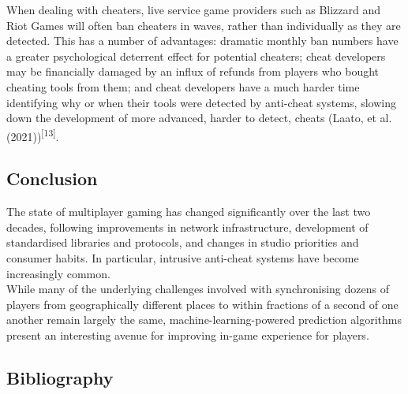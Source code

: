 \documentclass[
]{article}
\begin{document}
When dealing with cheaters, live service game providers such as Blizzard
and Riot Games will often ban cheaters in waves, rather than
individually as they are detected. This has a number of advantages:
dramatic monthly ban numbers have a greater psychological deterrent
effect for potential cheaters; cheat developers may be financially
damaged by an influx of refunds from players who bought cheating tools
from them; and cheat developers have a much harder time identifying why
or when their tools were detected by anti-cheat systems, slowing down
the development of more advanced, harder to detect, cheats (Laato, et
al. (2021))\textsuperscript{{[}13{]}}.

\hypertarget{conclusion}{%
\subsection{Conclusion}\label{conclusion}}

The state of multiplayer gaming has changed significantly over the last
two decades, following improvements in network infrastructure,
development of standardised libraries and protocols, and changes in
studio priorities and consumer habits. In particular, intrusive
anti-cheat systems have become increasingly common.\\
While many of the underlying challenges involved with synchronising
dozens of players from geographically different places to within
fractions of a second of one another remain largely the same,
machine-learning-powered prediction algorithms present an interesting
avenue for improving in-game experience for players.

\hypertarget{bibliography}{%
\subsection{Bibliography}\label{bibliography}}
\end{document}
